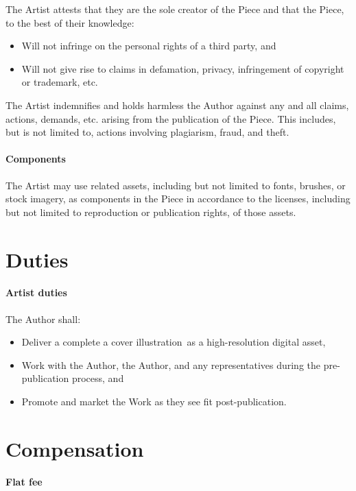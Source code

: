 \documentclass[12pt,letterpaper]{article}
\def\ArtType{a cover illustration}
\begin{document}
The Artist attests that they are the sole creator of the Piece and that the Piece, to the best of their knowledge:

\begin{itemize}
    \item Will not infringe on the personal rights of a third party, and
    \item Will not give rise to claims in defamation, privacy, infringement of copyright or trademark, etc.
\end{itemize}

The Artist indemnifies and holds harmless the Author against any and all claims, actions, demands, etc. arising from the publication of the Piece. This includes, but is not limited to, actions involving plagiarism, fraud, and theft.

\paragraph{Components}

The Artist may use related assets, including but not limited to fonts, brushes, or stock imagery, as components in the Piece in accordance to the licenses, including but not limited to reproduction or publication rights, of those assets.

\section{Duties}

\paragraph{Artist duties}

The Author shall:

\begin{itemize}
    \item Deliver a complete \ArtType\ as a high-resolution digital asset,
    \item Work with the Author, the Author, and any representatives during the pre-publication process, and
    \item Promote and market the Work as they see fit post-publication.
\end{itemize}

\section{Compensation}

\paragraph{Flat fee}
\end{document}
